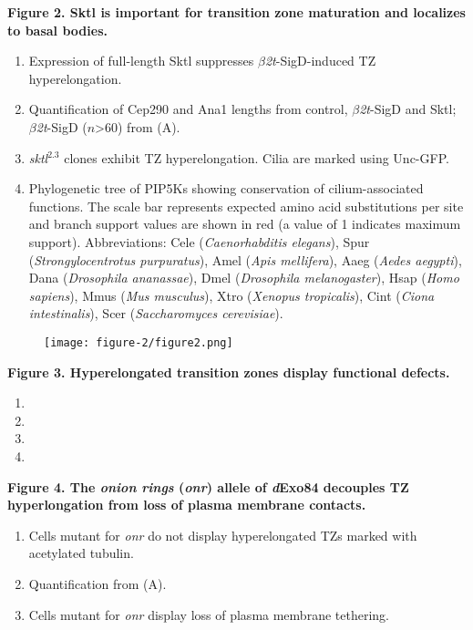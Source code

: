 \documentclass[12pt, twoside, letterpaper]{article}
\newcommand{\sigd}{$\beta$\textit{2t}-SigD}
\begin{document}
%
\textbf{Figure 2. Sktl is important for transition zone maturation and localizes to basal bodies.}
\begin{enumerate}[label={(\Alph*)}, nolistsep]
\item Expression of full-length Sktl suppresses \sigd{}-induced TZ hyperelongation.
\item Quantification of Cep290 and Ana1 lengths from control, \sigd{} and Sktl; \sigd{} ($n$\textgreater 60) from (A).
\item \textit{sktl}$^{2.3}$ clones exhibit TZ hyperelongation. Cilia are marked using
  Unc-GFP.
\item Phylogenetic tree of PIP5Ks showing conservation of cilium-associated functions.
  The scale bar represents expected amino acid substitutions per site and branch support values are shown in red (a value of 1 indicates maximum support).
Abbreviations: Cele (\textit{Caenorhabditis elegans}), Spur (\textit{Strongylocentrotus purpuratus}), Amel (\textit{Apis mellifera}), Aaeg (\textit{Aedes aegypti}), Dana (\textit{Drosophila ananassae}), Dmel (\textit{Drosophila melanogaster}), Hsap (\textit{Homo sapiens}), Mmus (\textit{Mus musculus}), Xtro (\textit{Xenopus tropicalis}), Cint (\textit{Ciona intestinalis}), Scer (\textit{Saccharomyces cerevisiae}).
\end{enumerate}

\begin{figure}[ht]
  \texttt{[image: figure-2/figure2.png]}
\end{figure}
\newpage


%
\textbf{Figure 3. Hyperelongated transition zones display functional defects.}
\begin{enumerate}[label={(\Alph*)}, nolistsep]
\item
\item
\item
\item
\end{enumerate}

\newpage


\textbf{Figure 4. The \textit{onion rings} (\textit{onr}) allele of \textit{d}Exo84 decouples TZ hyperlongation from loss of plasma membrane contacts.}
\begin{enumerate}[label={(\Alph*)}, nolistsep]
\item Cells mutant for \textit{onr} do not display hyperelongated TZs marked with acetylated tubulin.
\item Quantification from (A).
\item Cells mutant for \textit{onr} display loss of plasma membrane tethering.
\end{enumerate}

\end{document}
